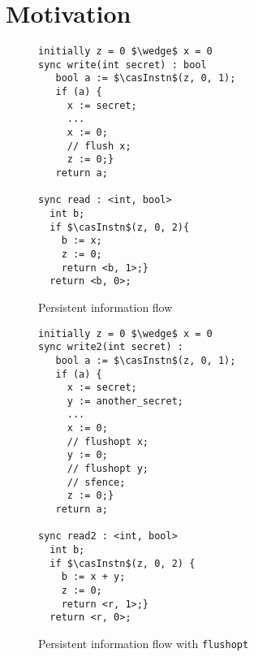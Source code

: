 \section{Motivation}



\begin{figure}
\centering
\quad \begin{minipage}[b]{0.4\linewidth}
\begin{lstlisting}
initially z = 0 $\wedge$ x = 0
sync write(int secret) : bool
   bool a := $\casInstn$(z, 0, 1); 
   if (a) {
     x := secret;
     ...
     x := 0;
     // flush x;
     z := 0;}
   return a; 

sync read : <int, bool>
  int b;
  if $\casInstn$(z, 0, 2){
    b := x;
    z := 0;
    return <b, 1>;}
  return <b, 0>;  \end{lstlisting}
\caption{Persistent information flow}
\label{fig:pif}
\end{minipage}
\qquad \quad 
\begin{minipage}[b]{0.48\linewidth}
\begin{lstlisting}
initially z = 0 $\wedge$ x = 0
sync write2(int secret) :
   bool a := $\casInstn$(z, 0, 1); 
   if (a) {
     x := secret;
     y := another_secret;
     ...
     x := 0;
     // flushopt x;
     y := 0;
     // flushopt y;
     // sfence;
     z := 0;}
   return a; 

sync read2 : <int, bool>
  int b;
  if $\casInstn$(z, 0, 2) {
    b := x + y;
    z := 0;
    return <r, 1>;}
  return <r, 0>; \end{lstlisting}
\caption{Persistent information flow with {\tt flushopt}}
\label{fig:pif-op}
\end{minipage}
\end{figure}






